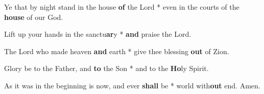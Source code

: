 \begin{multicols}{2}
	Ye that by night stand in the house \textbf{of} the Lord * even in the courts of the \textbf{house} of our God.
	
	Lift up your hands in the sanctu\textbf{ar}y * \textbf{and} praise the Lord.
	
	The Lord who made heaven \textbf{and} earth * give thee blessing \textbf{out} of Zion.
	
	Glory be to the Father, and \textbf{to} the Son * and to the \textbf{Ho}ly Spirit.
	
	As it was in the beginning is now, and ever \textbf{shall} be * world with\textbf{out} end. Amen.
\end{multicols}